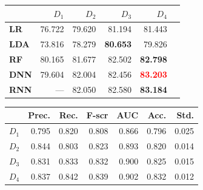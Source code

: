 \documentclass{article} %
\begin{document}
\begin{figure}
  \begin{minipage}[b]{0.49\textwidth}
    \centering
 \begin{tabularx}{\linewidth}{l r r r r r}
		\toprule[.2em]
		 &$D_1$& $D_2$&$D_3$&$D_4$\\
		\midrule
		{\bf LR}&76.722&79.620&81.194&81.443\\
		{\bf LDA}&73.816 & 78.279&{\bf 80.653} &79.826\\
		{\bf RF}&80.165 &81.677&82.502 &{\bf 82.798}\\
		{\bf DNN}&79.604& 82.004&82.456 &\textcolor{red}{\bf 83.203}\\
		{\bf RNN}&--- & 82.050&82.580&{\bf 83.184}\\
		\bottomrule[.2em]
	\end{tabularx}
	 \label{tab:perf2}
    \end{minipage}
\hfill
  \begin{minipage}[b]{0.49\textwidth}
    \centering
\begin{tabularx}{\linewidth}{l r r r r r r}
		\toprule[.2em]
		 &{\bf Prec.}& {\bf Rec.}&{\bf F-scr}&{\bf AUC}&{\bf Acc.}&{\bf Std.}\\
		\midrule
		$D_1$&0.795& 0.820&0.808 &0.866&0.796&0.025\\
		$D_2$&0.844 &0.803&0.823 &0.893&0.820&0.014\\
		$D_3$&0.831& 0.833&0.832 &0.900&0.825&0.015\\
		$D_4$&0.837& 0.842&0.839 &0.902&0.832&0.012\\
		\bottomrule[.2em]
	\end{tabularx}
	 \label{tab:dnnperf}
  \end{minipage}
 
  \end{figure}
\end{document}
